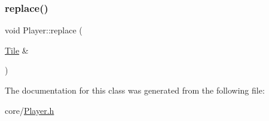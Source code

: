 \subsubsection{\texorpdfstring{replace()}{replace()}}
{\footnotesize\ttfamily void Player\+::replace (\begin{DoxyParamCaption}\item[{\mbox{\hyperlink{classTile}{Tile}} \&}]{ }\end{DoxyParamCaption})}



The documentation for this class was generated from the following file\+:\begin{DoxyCompactItemize}
\item 
core/\mbox{\hyperlink{Player_8h}{Player.\+h}}\end{DoxyCompactItemize}

